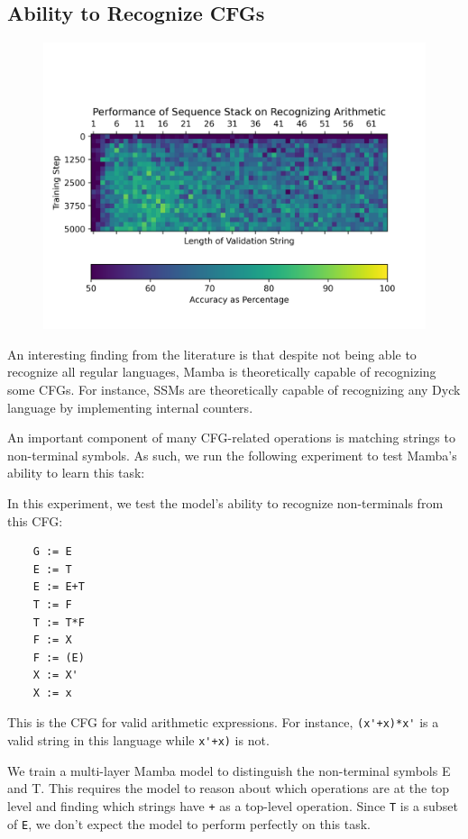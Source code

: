 \subsection{Ability to Recognize CFGs}
\begin{figure}
    \includegraphics[width=\textwidth]{figures/arithmetic.png}
    \caption{}
    \label{resultsarithmetic}
\end{figure}
An interesting finding from the literature is that despite not being able to
recognize all regular languages, Mamba is theoretically capable of recognizing
some CFGs. For instance, SSMs are theoretically capable of recognizing any Dyck
language by implementing internal counters\cite{ssmformal}.

An important component of many CFG-related operations is matching strings to
non-terminal symbols.
As such, we run the following experiment to test Mamba's ability to learn this
task:

In this experiment, we test the model's ability to recognize non-terminals from
this CFG:
\begin{verbatim}
    G := E
    E := T
    E := E+T
    T := F
    T := T*F
    F := X
    F := (E)
    X := X'
    X := x
\end{verbatim}
This is the CFG for valid arithmetic expressions.
For instance, \verb|(x'+x)*x'| is a valid string in this language while
\verb|x'+x)| is not.

We train a multi-layer Mamba model to distinguish the non-terminal symbols E and
T.
This requires the model to reason about which operations are at the top level
and finding which strings have \verb|+| as a top-level operation.
Since \verb|T| is a subset of \verb|E|, we don't expect the model to perform
perfectly on this task.

